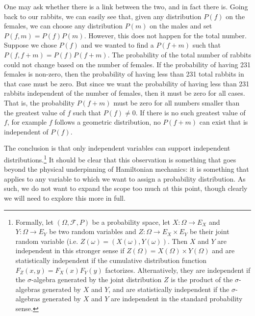 One may ask whether there is a link between the two, and in fact there is. Going back to our rabbits, we can easily see that, given any distribution $P(f)$ on the females, we can choose any distribution $P(m)$ on the males and set $P(f,m)=P(f)P(m)$. However, this does not happen for the total number. Suppose we chose $P(f)$ and we wanted to find a $P(f+m)$ such that $P(f, f+m) = P(f)P(f+m)$. The probability of the total number of rabbits could not change based on the number of females. If the probability of having 231 females is non-zero, then the probability of having less than 231 total rabbits in that case must be zero. But since we want the probability of having less than 231 rabbits independent of the number of females, then it must be zero for all cases. That is, the probability $P(f+m)$ must be zero for all numbers smaller than the greatest value of $f$ such that $P(f) \neq 0$. If there is no such greatest value of $f$, for example $f$ follows a geometric distribution, no $P(f+m)$ can exist that is independent of $P(f)$.


The conclusion is that only independent variables can support independent distributions.\footnote{Formally, let $(\Omega, \mathcal{F}, P)$ be a probability space, let $X : \Omega \to E_X$ and $Y : \Omega \to E_Y$ be two random variables and $Z : \Omega \to E_X \times E_Y$ be their joint random variable (i.e. $Z(\omega) = (X(\omega), Y(\omega))$. Then $X$ and $Y$ are independent in this stronger sense if $Z(\Omega) = X(\Omega) \times Y(\Omega)$ and are statistically independent if the cumulative distribution function $F_Z(x,y)=F_X(x)F_Y(y)$ factorizes. Alternatively, they are independent if the $\sigma$-algebra generated by the joint distribution $Z$ is the product of the $\sigma$-algebras generated by $X$ and $Y$, and are statistically independent if the $\sigma$-algebras generated by $X$ and $Y$ are independent in the standard probability sense. } It should be clear that this observation is something that goes beyond the physical underpinning of Hamiltonian mechanics: it is something that applies to any variable to which we want to assign a probability distribution. As such, we do not want to expand the scope too much at this point, though clearly we will need to explore this more in full.

